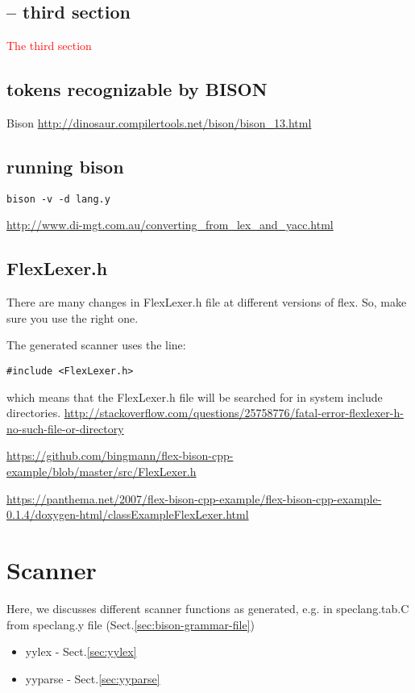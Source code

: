 \subsection{-- third section}
\label{sec:bison-grammar-file-third-section}

\textcolor{red}{The third section}

\subsection{tokens recognizable by BISON}

Bison 
\url{http://dinosaur.compilertools.net/bison/bison_13.html}


\subsection{running bison}

\begin{verbatim}
bison -v -d lang.y
\end{verbatim}

\url{http://www.di-mgt.com.au/converting_from_lex_and_yacc.html}

\subsection{FlexLexer.h}

There are many changes in FlexLexer.h file at different versions of flex.
So, make sure you use the right one.

The generated scanner uses the line:
\begin{verbatim}
#include <FlexLexer.h>

\end{verbatim}
which means that the FlexLexer.h file will be searched for in system include directories. 
\url{http://stackoverflow.com/questions/25758776/fatal-error-flexlexer-h-no-such-file-or-directory}

\url{https://github.com/bingmann/flex-bison-cpp-example/blob/master/src/FlexLexer.h}

\url{https://panthema.net/2007/flex-bison-cpp-example/flex-bison-cpp-example-0.1.4/doxygen-html/classExampleFlexLexer.html}

\section{Scanner}

Here, we discusses different scanner functions as generated, e.g. in speclang.tab.C from speclang.y file (Sect.\ref{sec:bison-grammar-file})
\begin{itemize}
  \item yylex - Sect.\ref{sec:yylex}
  
  \item yyparse - Sect.\ref{sec:yyparse}
\end{itemize}

